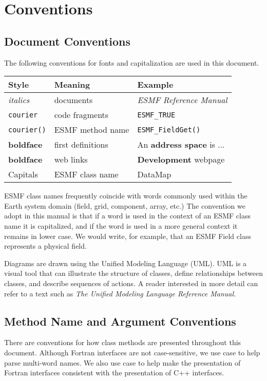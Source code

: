 \section{Conventions}
\label{sec:conventions}

\subsection{Document Conventions}

The following conventions for fonts and capitalization are used
in this document. \newline

\begin{tabular}{lll}
{\bf Style} & {\bf Meaning} & {\bf Example} \\ \hline
{\it italics}  & documents & {\it ESMF Reference Manual}\\
{\tt courier}  & code fragments & {\tt ESMF\_TRUE}\\
{\tt courier()}  & ESMF method name & {\tt ESMF\_FieldGet()} \\
{\bf boldface} & first definitions & An {\bf address space} is ...\\
{\bf boldface} & web links & {\bf Development} webpage \\
{Capitals}     & ESMF class name & DataMap \\
\end{tabular} 
 
ESMF class names frequently coincide with words commonly
used within the Earth system domain (field, grid, component, array, 
etc.)  The convention we adopt in this manual is that if a word is 
used in the context of an ESMF class name it is capitalized, and 
if the word is used in a more general context it remains in lower 
case.  We would write, for example, that an ESMF Field class 
represents a physical field.  

Diagrams are drawn using the Unified Modeling Language (UML).  UML 
is a visual tool that can illustrate the structure of 
classes, define relationships between classes, and describe sequences
of actions.  A reader interested in more detail can refer to a 
text such as {\it The Unified Modeling Language Reference Manual.}
 \cite{uml}

\subsection{Method Name and Argument Conventions}

There are conventions for how class methods are presented throughout 
this document.  Although Fortran interfaces are not case-sensitive,
we use case to help parse multi-word names.  We also use case to help
make the presentation of Fortran interfaces consistent with the 
presentation of C++ interfaces.  

